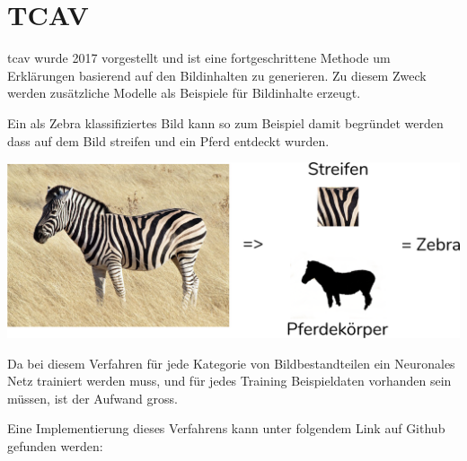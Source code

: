 \documentclass[
  12pt, %
  a4paper, %
  oneside, %
  openany, 
  numbers=noenddot, %
  BCOR=5mm, %
  parskip=half*, %
  thesis, %
]{bfhbook}
\begin{document}
\section{TCAV}
 \acrfull{tcav} wurde 2017 vorgestellt \parencite{Kim2017} und ist eine fortgeschrittene Methode um Erklärungen basierend auf den Bildinhalten zu generieren. Zu diesem Zweck werden zusätzliche Modelle als Beispiele für Bildinhalte erzeugt.
 
\break
 Ein als Zebra klassifiziertes Bild kann so zum Beispiel damit begründet werden dass auf dem Bild streifen und ein Pferd entdeckt wurden.
\begin{center}
\begin{minipage}[t]{\linewidth}
\includegraphics[width=\textwidth]{Bilder/Zebra-Explanation.PNG}
\end{minipage}
\end{center}
Da bei diesem Verfahren für jede Kategorie von Bildbestandteilen ein Neuronales Netz trainiert werden muss, und für jedes Training Beispieldaten vorhanden sein müssen, ist der Aufwand gross. 

Eine Implementierung dieses Verfahrens kann unter folgendem Link auf Github gefunden werden: \cite{tcavLink}
\end{document}
